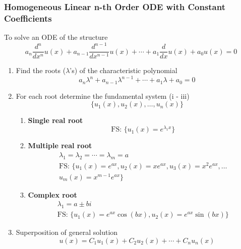 \subsubsection{Homogeneous Linear n-th Order ODE with Constant Coefficients}\label{ssec:homLinNODE}
To solve an ODE of the structure
\begin{equation*}
    a_n \frac{d^n}{dx^n} u(x) + a_{n-1} \frac{d^{n-1}}{dx^{n-1}} u(x) + \cdots + a_1 \frac{d}{dx} u(x) + a_0 u(x) = 0
\end{equation*}
\begin{enumerate}
    \item Find the roots ($\lambda$'s) of the characteristic polynomial
          \begin{equation*}
              a_n\lambda^n + a_{n-1}\lambda^{n-1} + \cdots + a_1\lambda + a_0 = 0
          \end{equation*}
    \item For each root determine the fundamental system (i - iii)
          \begin{equation*}
              \{u_1(x), u_2(x), \ldots , u_n(x)\}
          \end{equation*}
          \begin{enumerate}[label= (\roman*)]
              \item \textbf{Single real root}
                    \begin{equation*}
                        \text{FS: } \{u_1(x)=e^{\lambda_1 x}\}
                    \end{equation*}
              \item \textbf{Multiple real root}
                    \begin{gather*}
                        \lambda_1 = \lambda_2 = \cdots = \lambda_m = a \\
                        \text{FS: } \{u_1(x)=e^{ax}, u_2(x)=xe^{ax}, u_3(x)=x^2e^{ax}, \ldots \\
                        u_m(x) = x^{m-1} e^{ax} \}
                    \end{gather*}
              \item \textbf{Complex root}
                    \begin{gather*}
                        \lambda_1 = a \pm b i \\
                        \text{FS: } \{u_1(x)=e^{ax}\cos(bx), u_2(x)=e^{ax}\sin(bx)\}
                    \end{gather*}
          \end{enumerate}
    \item Superposition of general solution
          \begin{equation*}
              u(x) = C_1 u_1(x) + C_2 u_2(x) + \cdots + C_n u_n(x)
          \end{equation*}
\end{enumerate}


